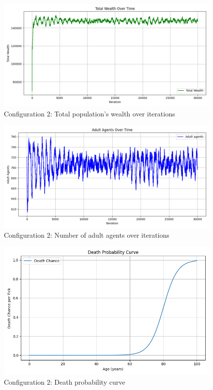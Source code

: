 \documentclass[english]{projectreport}
\begin{document}
    \begin{figure}[H]
        \centering
        \includegraphics[width=0.8\linewidth]{metrics_config2/metrics_config2_total_wealth.png}
        \caption{Configuration 2: Total population's wealth over iterations}
        \label{fig:c0-total_wealth}
    \end{figure}

    \begin{figure}[H]
        \centering
        \includegraphics[width=0.8\linewidth]{metrics_config2/metrics_config2_adult_agents.png}
        \caption{Configuration 2: Number of adult agents over iterations}
        \label{fig:c0-adult_agents}
    \end{figure}

    \begin{figure}[H]
        \centering
        \includegraphics[width=0.8\linewidth]{metrics_config2/metrics_config2_death_probability_curve.png}
        \caption{Configuration 2: Death probability curve}
        \label{fig:c0-death_probability_curve}
    \end{figure}
\end{document}
